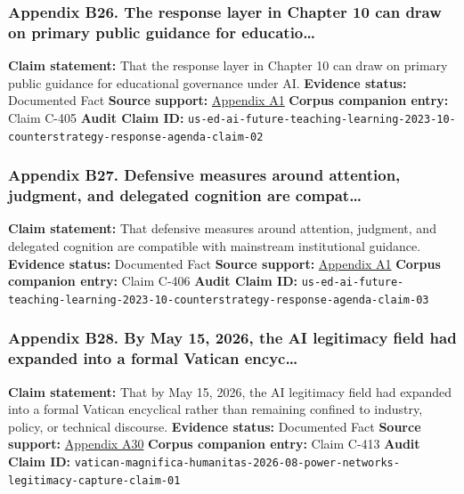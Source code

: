 \documentclass[
  american,
  11pt,
  letterpaper,
]{article}
\begin{document}
\subsubsection{Appendix B26. The response layer in Chapter 10 can draw
on primary public guidance for
educatio\ldots{}}\label{appendix-b26-the-response-layer-in-chapter-10-can-draw-on-primary-public-guidance-for-educatio}

\textbf{Claim statement:} That the response layer in Chapter 10 can draw
on primary public guidance for educational governance under AI.
\textbf{Evidence status:} Documented Fact \textbf{Source support:}
\hyperref[appendix-a1-artificial-intelligence-and-the-future-of-teaching-and-learning-insights-and-recommendations]{Appendix
A1} \textbf{Corpus companion entry:} Claim C-405 \textbf{Audit Claim
ID:}
\texttt{us-ed-ai-future-teaching-learning-2023-10-counterstrategy-response-agenda-claim-02}

\subsubsection{Appendix B27. Defensive measures around attention,
judgment, and delegated cognition are
compat\ldots{}}\label{appendix-b27-defensive-measures-around-attention-judgment-and-delegated-cognition-are-compat}

\textbf{Claim statement:} That defensive measures around attention,
judgment, and delegated cognition are compatible with mainstream
institutional guidance. \textbf{Evidence status:} Documented Fact
\textbf{Source support:}
\hyperref[appendix-a1-artificial-intelligence-and-the-future-of-teaching-and-learning-insights-and-recommendations]{Appendix
A1} \textbf{Corpus companion entry:} Claim C-406 \textbf{Audit Claim
ID:}
\texttt{us-ed-ai-future-teaching-learning-2023-10-counterstrategy-response-agenda-claim-03}

\subsubsection{Appendix B28. By May 15, 2026, the AI legitimacy field
had expanded into a formal Vatican
encyc\ldots{}}\label{appendix-b28-by-may-15-2026-the-ai-legitimacy-field-had-expanded-into-a-formal-vatican-encyc}

\textbf{Claim statement:} That by May 15, 2026, the AI legitimacy field
had expanded into a formal Vatican encyclical rather than remaining
confined to industry, policy, or technical discourse. \textbf{Evidence
status:} Documented Fact \textbf{Source support:}
\hyperref[appendix-a30-encyclical-letter-of-his-holiness-leo-xiv-magnifica-humanitas]{Appendix
A30} \textbf{Corpus companion entry:} Claim C-413 \textbf{Audit Claim
ID:}
\texttt{vatican-magnifica-humanitas-2026-08-power-networks-legitimacy-capture-claim-01}
\end{document}
